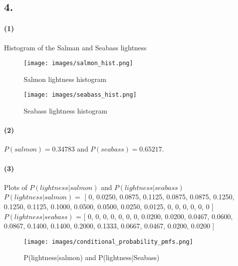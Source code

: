 \documentclass[a4paper]{article}
\begin{document}
\setcounter{page}{8}

\subsection*{4. }

%
%
\paragraph{(1) } Histogram of the Salman and Seabass lightness ~\\
\begin{figure}[H]
  \centering
    \texttt{[image: images/salmon\_hist.png]}
  \caption{Salmon lightness histogram}
\end{figure}

\begin{figure}[H]
  \centering
    \texttt{[image: images/seabass\_hist.png]}
  \caption{Seabass lightness histogram}
\end{figure}

%
%
\paragraph{(2) } $P(salmon) = 0.34783$ and $P(seabass) = 0.65217$.

%
%
\paragraph{(3) } Plots of $P(lightness|salmon)$ and $P(lightness|seabass)$ ~\\

$P(lightness|salmon) = $ [
         0,
    0.0250,
    0.0875,
    0.1125,
    0.0875,
    0.0875,
    0.1250,
    0.1250,
    0.1125,
    0.1000,
    0.0500,
    0.0500,
    0.0250,
    0.0125,
         0,
         0,
         0,
         0,
         0,
         0 ]\\

$P(lightness|seabass)$ = [
         0,
         0,
         0,
         0,
         0,
         0,
         0,
    0.0200,
    0.0200,
    0.0467,
    0.0600,
    0.0867,
    0.1400,
    0.1400,
    0.2000,
    0.1333,
    0.0667,
    0.0467,
    0.0200,
    0.0200 ]
\begin{figure}[H]
  \centering
    \texttt{[image: images/conditional\_probability\_pmfs.png]}
  \caption{P(lightness|salmon) and P(lightness|Seabass)}
\end{figure}
\end{document}
